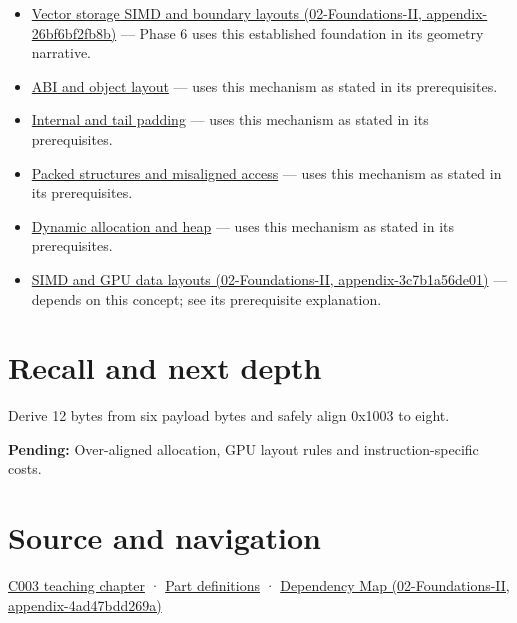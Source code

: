 \begin{itemize}
\item
  \href{../02-Foundations-II/main.pdf\#nameddest=appendix-26bf6bf2fb8b}{Vector storage SIMD and boundary layouts (02-Foundations-II, appendix-26bf6bf2fb8b)} --- Phase 6 uses this established foundation in its geometry narrative.
\item
  \hyperref[appendix-c4ac6bb0fff8]{ABI and object layout} --- uses this mechanism as stated in its prerequisites.
\item
  \hyperref[appendix-f52f8c5a3afd]{Internal and tail padding} --- uses this mechanism as stated in its prerequisites.
\item
  \hyperref[appendix-0682dbfc5f0e]{Packed structures and misaligned access} --- uses this mechanism as stated in its prerequisites.
\item
  \hyperref[appendix-c3480f7d9ff3]{Dynamic allocation and heap} --- uses this mechanism as stated in its prerequisites.
\item
  \href{../02-Foundations-II/main.pdf\#nameddest=appendix-3c7b1a56de01}{SIMD and GPU data layouts (02-Foundations-II, appendix-3c7b1a56de01)} --- depends on this concept; see its prerequisite explanation.
\end{itemize}

\section{Recall and next depth}\label{appendix-a1f7c53b4742-recall-and-next-depth}

Derive 12 bytes from six payload bytes and safely align 0x1003 to eight.

\textbf{Pending:} Over-aligned allocation, GPU layout rules and instruction-specific costs.

\section{Source and navigation}\label{appendix-a1f7c53b4742-source-and-navigation}

\href{Continuous\%20Notes/Computing\%20Foundations\%20-\%20From\%20Bits\%20to\%20C++\%20and\%20Systems\%20APIs\#Where\%20the\%20bytes\%20live}{C003 teaching chapter} · \hyperref[appendix-fd090d982a15-m003---parts-41-60]{Part definitions} · \href{../02-Foundations-II/main.pdf\#nameddest=appendix-4ad47bdd269a}{Dependency Map (02-Foundations-II, appendix-4ad47bdd269a)}
